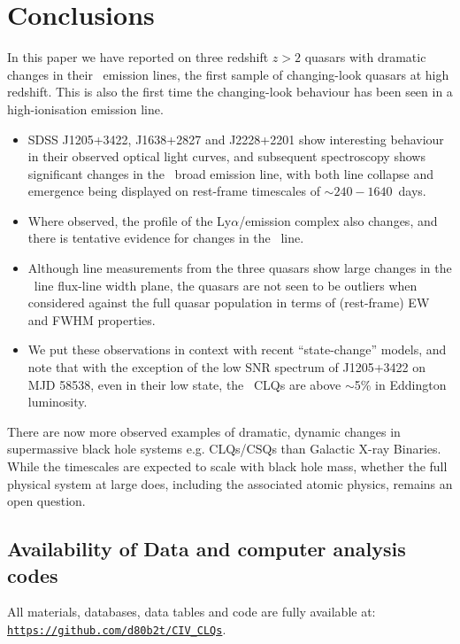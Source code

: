 \documentclass[fleqn,usenatbib]{mnras}
\begin{document}
\section{Conclusions}
In this paper we have reported on three redshift $z>2$ quasars with
dramatic changes in their \civ\ emission lines, the first sample of
changing-look quasars at high redshift.  This is also the first time
the changing-look behaviour has been seen in a high-ionisation
emission line.

\begin{itemize}
\item SDSS J1205+3422, J1638+2827 and J2228+2201 show interesting
  behaviour in their observed optical light curves, and subsequent
  spectroscopy shows significant changes in the \civ\ broad emission
  line, with both line collapse and emergence being displayed on
  rest-frame timescales of $\sim 240-1640$~days.
\item Where observed, the profile of the Ly$\alpha$/\nv emission complex
  also changes, and there is tentative evidence for changes in the \mgii\
  line.
\item Although line measurements from the three quasars show large changes
  in the \civ\ line flux-line width plane, the quasars are not seen to
  be outliers when considered against the full quasar population
  in terms of (rest-frame) EW and FWHM properties.
\item 
  We put these observations in context with recent ``state-change''
  models, and note that with the exception of the low SNR spectrum of
  J1205+3422 on MJD 58538, even in their low state, 
  the \civ\ CLQs are above $\sim$5\% in Eddington luminosity. 
\end{itemize}

There are now more observed examples of dramatic, dynamic changes in
supermassive black hole systems e.g. CLQs/CSQs than Galactic X-ray
Binaries.  While the timescales are expected to scale with black hole
mass, whether the full physical system at large does, including the
associated atomic physics, remains an open question.


\subsection*{Availability of Data and computer analysis codes} 
All materials, databases, data tables and code are fully available at: 
\href{https://github.com/d80b2t/CIV_CLQs}{\tt https://github.com/d80b2t/CIV\_CLQs}.
\end{document}
